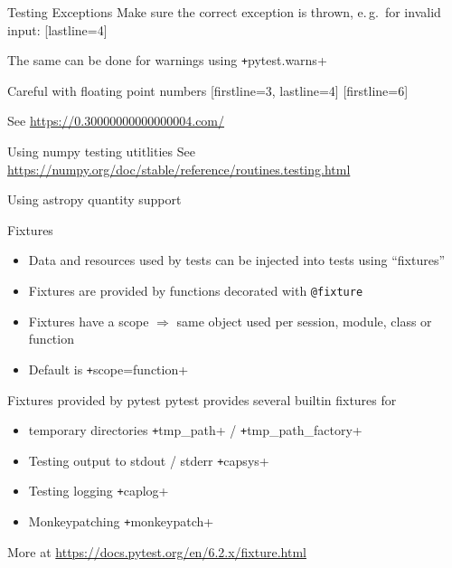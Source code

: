 \documentclass[
  aspectratio=1610,
]{beamer}
\begin{document}
\begin{frame}[c]{Testing Exceptions}
  Make sure the correct exception is thrown, e.\,g.\ for invalid input:
  [lastline=4]

  The same can be done for warnings using \texttt+pytest.warns+
\end{frame}


\begin{frame}[c, fragile]{Careful with floating point numbers}
  [firstline=3, lastline=4]
  [firstline=6]

  See \url{https://0.30000000000000004.com/}
\end{frame}

\begin{frame}[c, fragile]{Using numpy testing utitlities}
  See \url{https://numpy.org/doc/stable/reference/routines.testing.html}
\end{frame}

\begin{frame}[c, fragile]{Using astropy quantity support}
\end{frame}

\begin{frame}[c]{Fixtures}
  \begin{itemize}
    \item Data and resources used by tests can be injected into tests using \enquote{fixtures}
    \item Fixtures are provided by functions decorated with \texttt{@fixture}
    \item Fixtures have a scope $⇒$ same object used per session, module, class or function
    \item Default is \texttt+scope=function+
  \end{itemize}
\end{frame}

\begin{frame}[c]{Fixtures provided by pytest}
  pytest provides several builtin fixtures for
  \begin{itemize}
    \item temporary directories \texttt+tmp_path+ / \texttt+tmp_path_factory+
    \item Testing output to stdout / stderr \texttt+capsys+
    \item Testing logging \texttt+caplog+
    \item Monkeypatching \texttt+monkeypatch+
  \end{itemize}
  More at \url{https://docs.pytest.org/en/6.2.x/fixture.html}
\end{frame}
\end{document}
